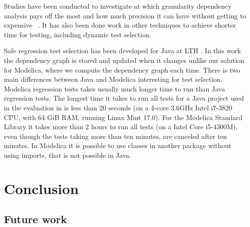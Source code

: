 \documentclass{cslthse-msc}
\begin{document}
Studies have been conducted to investigate at which granularity dependency analysis pays off the most and how much precision it can have without getting to expensive ~\cite{DBLP:conf/sigsoft/LegunsenHSLZM16}. It has also been done work in other techniques to achieve shorter time for testing, including dynamic test selection.

Safe regression test selection has been developed for Java at LTH \cite{DBLP:conf/pppj/OqvistHM16}. In this work the dependency graph is stored and updated when it changes unlike our solution for Modelica, where we compute the dependency graph each time. There is two main differences between Java and Modelica interesting for test selection. Modelica regression tests takes usually much longer time to run than Java regression tests. The longest time it takes to run all tests for a Java project used in the evaluation in \cite{DBLP:conf/pppj/OqvistHM16} is less than 20 seconds (on a 4-core 3.6GHz Intel i7-3820 CPU, with 64 GiB RAM, running Linux Mint 17.0). For the Modelica Standard Library it takes more than 2 hours to run all tests (on a Intel Core i5-4300M), even though the tests taking more than ten minutes, are canceled after ten minutes. In Modelica it is possible to use classes in another package without using imports, that is not possible in Java.

\chapter[Conclusion]{Conclusion}


\section{Future work}

\printbibliography[heading=bibintoc]

\end{document}
